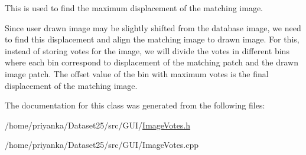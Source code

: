 \-This is used to find the maximum displacement of the matching image. 

\-Since user drawn image may be slightly shifted from the database image, we need to find this displacement and align the matching image to drawn image. \-For this, instead of storing votes for the image, we will divide the votes in different bins where each bin correspond to displacement of the matching patch and the drawn image patch. \-The offset value of the bin with maximum votes is the final displacement of the matching image. 

\-The documentation for this class was generated from the following files\-:\begin{DoxyCompactItemize}
\item 
/home/priyanka/\-Dataset25/src/\-G\-U\-I/\hyperlink{ImageVotes_8h}{\-Image\-Votes.\-h}\item 
/home/priyanka/\-Dataset25/src/\-G\-U\-I/\-Image\-Votes.\-cpp\end{DoxyCompactItemize}
